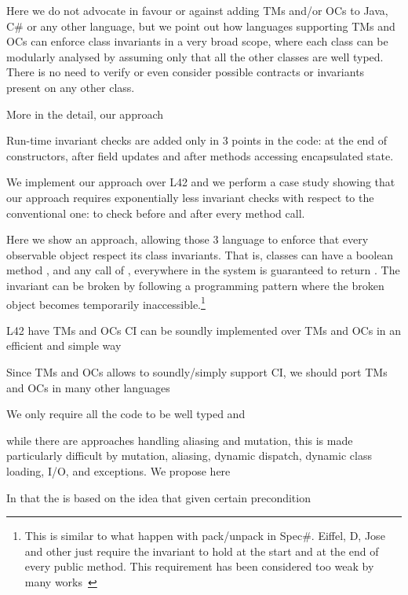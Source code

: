 Here we do not advocate in favour or against adding
TMs and/or OCs to Java, C\# or any other language, but we point out how languages supporting TMs and OCs can
enforce class invariants in a very broad scope, where
each class can be modularly analysed by assuming only that all the other classes are well typed.
There is no need to verify or even consider possible contracts or invariants present on any other class.

\LINE
More in the detail, our approach 

Run-time invariant checks are added only in 3 points in the code: at the end of constructors, after field updates and after methods accessing encapsulated state.


We implement our approach over L42 and we perform a
case study showing that our approach requires 
exponentially less invariant checks with respect to the conventional one: to check before and after every method call.


Here we show an approach, allowing those 3 language 
to  enforce that every observable object respect its class invariants.
That is, classes can have a boolean method \Q@invariant@,
and any call of \Q@invariant@, everywhere in the system is guaranteed to return \Q@true@.
The invariant can be broken by following a programming pattern where the broken object becomes temporarily inaccessible.\footnote{
	This is similar to what happen with pack/unpack in Spec\#.
	Eiffel, D, Jose and other just require the invariant to hold at the start and at the end of every public method. This requirement has been considered too weak by many works~\cite{??}
}





L42 have TMs and OCs
CI can be soundly implemented over TMs and OCs
in an efficient and simple way

Since TMs and OCs allows to soundly/simply support CI,
we should port TMs and OCs in many other languages


\LINE


We only require all the code to be well typed and 


while 
there are approaches handling aliasing and mutation,
this is made particularly difficult by mutation, aliasing, dynamic dispatch, dynamic class loading,
I/O, and exceptions.
We propose here 

In
that the 
is based on the idea that 
given certain precondition




